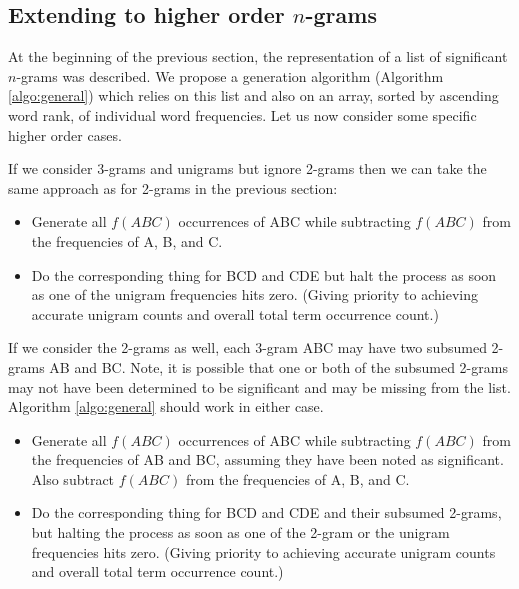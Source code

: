 \documentclass[11pt]{report}
\begin{document}
 

\subsection{Extending to higher order $n$-grams}

At the beginning of the previous section, the representation of a list
of significant $n$-grams was described.  We propose a generation algorithm
(Algorithm \ref{algo:general}) which relies on this list and also on an
array, sorted by ascending word rank, of individual word frequencies.  
Let us now consider some specific higher order cases.

If we consider 3-grams and unigrams but ignore 2-grams then we can
take the same approach as for 2-grams in the previous section:

\begin{itemize}
  \item Generate all $f(A B C)$ occurrences of ABC while
    subtracting $f(A B C)$ from the frequencies of A, B, and C.
  \item Do the corresponding thing for BCD and CDE but
    halt the process as soon as one of the unigram frequencies hits
    zero.  (Giving priority to achieving accurate unigram counts and
    overall total term occurrence count.)
\end{itemize}

If we consider the 2-grams as well, each 3-gram ABC may have two
subsumed 2-grams AB and BC.  Note, it is possible that one
or both of the subsumed
2-grams may not have been determined to be significant and may be
missing from the list.  Algorithm \ref{algo:general} should work in
either case.

\begin{itemize}
  \item Generate all $f(A B C)$ occurrences of ABC while
    subtracting $f(A B C)$ from the frequencies of AB and BC,
    assuming they have been noted as significant.  Also subtract
    $f(ABC)$ from the frequencies of A, B, and C.
  \item Do the corresponding thing for BCD and CDE and
    their subsumed 2-grams, but
    halting the process as soon as one of the 2-gram or the unigram frequencies hits
    zero.  (Giving priority to achieving accurate unigram counts and
    overall total term occurrence count.)
\end{itemize}
\end{document}
